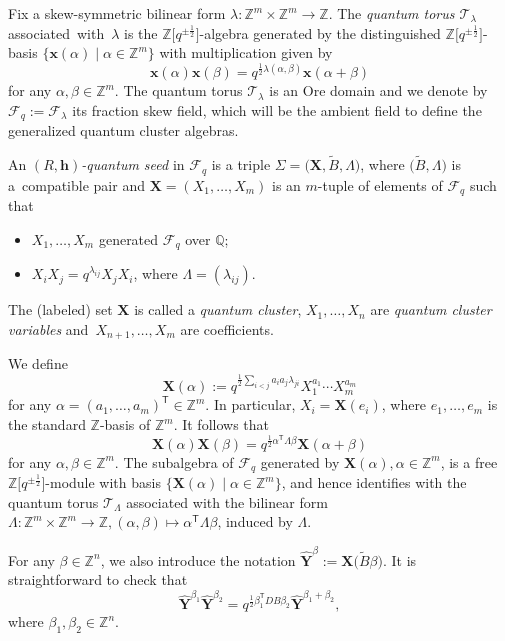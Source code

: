\documentclass[pdftex]{sigma}
\newcommand{\Z}{\mathbb{Z}}
\numberwithin{equation}{section}
\begin{document}
 Fix a skew-symmetric bilinear form $\lambda\colon\mathbb{Z}^{m}\times \mathbb{Z}^m\to \mathbb{Z}$. The {\it quantum torus $\mathcal{T}_\lambda$} associated~with~$\lambda$ is the $\mathbb{Z}\big[q^{\pm\frac{1}{2}}\big]$-algebra generated by the distinguished $\mathbb{Z}\big[q^{\pm\frac{1}{2}}\big]$-basis $\{\mathbf{x}(\alpha)\mid \alpha\in \mathbb{Z}^m\}$ with multiplication given by
\[
\mathbf{x}(\alpha)\mathbf{x}(\beta)=q^{\frac{1}{2}\lambda(\alpha,\beta)}\mathbf{x}(\alpha+\beta)
\]
for any $\alpha,\beta\in \mathbb{Z}^m$. The quantum torus $\mathcal{T}_\lambda$ is an Ore domain and we denote by $\mathcal{F}_q:=\mathcal{F}_\lambda$ its fraction skew field, which will be the ambient field to define the generalized quantum cluster algebras.
\begin{Definition}
 An {\it $(R,\mathbf{h})$-quantum seed} in $\mathcal{F}_q$ is a triple $\Sigma=\bigl(\mathbf{X},\tilde{B},\Lambda\bigr)$, where $\bigl(\tilde{B},\Lambda\bigr)$ is a~compatible pair and $\mathbf{X}=(X_1,\dots, X_m)$ is an $m$-tuple of elements of $\mathcal{F}_q$ such that
 \begin{itemize}\itemsep=0pt
 \item $X_1,\dots, X_{m}$ generated $\mathcal{F}_q$ over $\mathbb{Q}$;
 \item $X_iX_j=q^{\lambda_{ij}}X_jX_i$, where $\Lambda=(\lambda_{ij})$.
 \end{itemize}
 The (labeled) set $\mathbf{X}$ is called a {\it quantum cluster}, $X_1,\dots, X_n$ are {\it quantum cluster variables} and~${X_{n+1},\dots, X_m}$ are coefficients.
\end{Definition}
We define \[\mathbf{X}(\alpha):=q^{\frac{1}{2}\sum_{i<j}a_ia_j\lambda_{ji}}X_1^{a_1}\cdots X_{m}^{a_{m}}\] for any $\alpha=(a_1,\dots, a_{m})^{\mathsf T}\in \mathbb{Z}^{m}$. In particular, $X_i=\mathbf{X}(e_i)$, where $e_1,\dots, e_m$ is the standard $\Z$-basis of $\Z^m$.
It follows that
 \[
 \mathbf{X}(\alpha) \mathbf{X}(\beta)=q^{\frac{1}{2}\alpha^{\mathsf T}\Lambda \beta}\mathbf{X}({\alpha+\beta})
 \]
 for any $\alpha,\beta\in \Z^{m}$. The subalgebra of $\mathcal{F}_q$ generated by $\mathbf{X}(\alpha), \alpha\in \Z^{m}$, is a free $\Z\big[q^{\pm\frac{1}{2}}\big]$-module with basis $\{\mathbf{X}(\alpha) \mid \alpha\in \Z^{m}\}$, and hence identifies with the quantum torus $\mathcal{T}_\Lambda$ associated with the bilinear form $\Lambda\colon\Z^m\times \Z^m\to \Z, (\alpha,\beta)\mapsto \alpha^{\mathsf T}\Lambda \beta$, induced by $\Lambda$.

 For any $\beta\in \Z^n$, we also introduce the notation
$
 \hat{\mathbf{Y}}^{\beta}:=\mathbf{X}\bigl(\tilde{B}\beta\bigr)$.
 It is straightforward to check that
 \[
 \hat{\mathbf{Y}}^{\beta_1}\hat{\mathbf{Y}}^{\beta_2}=q^{\frac{1}{2}\beta_1^{\mathsf T}DB\beta_2}\hat{\mathbf{Y}}^{\beta_1+\beta_2},
 \]
 where $\beta_1,\beta_2\in \Z^n$.
\end{document}
